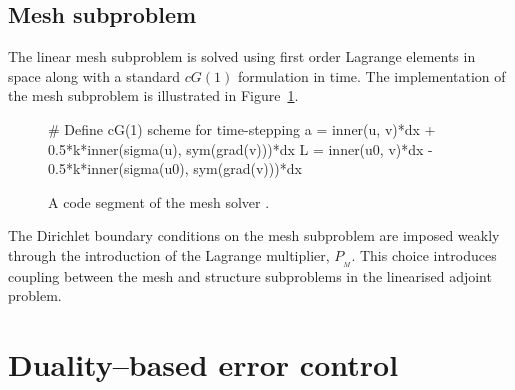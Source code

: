 \newpage
\subsection{Mesh subproblem}

The linear mesh subproblem is solved using first order Lagrange
elements in space along with a standard $cG(1)$ formulation in time.
The implementation of the mesh subproblem is illustrated in
Figure~\ref{selim:fig:meshsolver}.
\begin{figure}
\caption{A code segment of the mesh solver .}
\label{selim:fig:meshsolver}
\begin{python}
  # Define cG(1) scheme for time-stepping
  a = inner(u, v)*dx + 0.5*k*inner(sigma(u), sym(grad(v)))*dx
  L = inner(u0, v)*dx - 0.5*k*inner(sigma(u0), sym(grad(v)))*dx
\end{python}
\end{figure}
The Dirichlet boundary conditions on the mesh subproblem are imposed
weakly through the introduction of the Lagrange multiplier,
$P_{_{M}}$. This choice introduces coupling between the mesh and
structure subproblems in the linearised adjoint problem.

\section{Duality--based error control}

